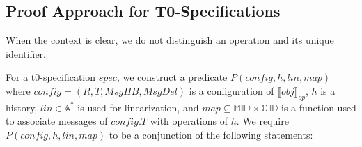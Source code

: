  




\subsection{Proof Approach for T0-Specifications}
\label{subsec:proof approach for t0-specifications} 

When the context is clear, we do not distinguish an operation and its unique identifier. 

For a t0-specification $\mathit{spec}$, we construct a predicate $P(\mathit{config},h,\mathit{lin},\mathit{map})$ where $\mathit{config} = (R,T,\mathit{MsgHB},\mathit{MsgDel})$ is a configuration of $\llbracket \mathit{obj} \rrbracket_{\mathit{op}}$, $h$ is a history, $\mathit{lin} \in \mathbb{A}^*$ is used for linearization, and $\mathit{map} \subseteq \mathbb{MID} \times \mathbb{OID}$ is a function used to associate messages of $\mathit{config}.T$ with operations of $h$. We require $P(\mathit{config},h,\mathit{lin},\mathit{map})$ to be a conjunction of the following statements:

